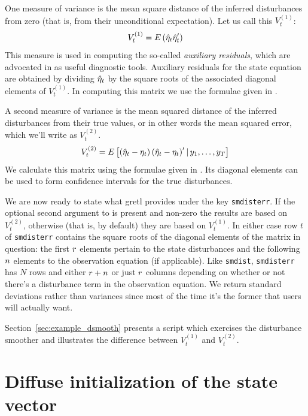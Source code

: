 One measure of variance is the mean square distance of the inferred
disturbances from zero (that is, from their unconditional
expectation). Let us call this $V^{(1)}_t$:
\[
V^{(1)}_t = E\left(\hat{\eta}_t\hat{\eta}_t'\right)
\]
This measure is used in computing the so-called \emph{auxiliary
  residuals}, which are advocated in \cite{durbin-koopman12} as useful
diagnostic tools. Auxiliary residuals for the state equation are
obtained by dividing $\hat{\eta}_t$ by the square roots of the
associated diagonal elements of $V^{(1)}_t$. In computing this matrix
we use the formulae given in \citet[section 4.4]{koopman-etal99}.

A second measure of variance is the mean squared distance of the
inferred disturbances from their true values, or in other words the
mean squared error, which we'll write as $V^{(2)}_t$.
\[
V^{(2)}_t = E\left[\left(\hat{\eta}_t - \eta_t\right)
  \left(\hat{\eta}_t - \eta_t\right)'
  | \,y_1, \ldots, y_T \right]
\]
We calculate this matrix using the formulae given in \citet[section
4.5.2]{durbin-koopman12}. Its diagonal elements can be used to form
confidence intervals for the true disturbances.

We are now ready to state what gretl provides under the key
\texttt{smdisterr}. If the optional second argument to 
is present and non-zero the results are based on $V^{(2)}_t$,
otherwise (that is, by default) they are based on $V^{(1)}_t$. In
either case row $t$ of \texttt{smdisterr} contains the square roots of
the diagonal elements of the matrix in question: the first $r$
elements pertain to the state disturbances and the following $n$
elements to the observation equation (if applicable). Like
\texttt{smdist}, \texttt{smdisterr} has $N$ rows and either
$r + n$ or just $r$ columns depending on whether or
not there's a disturbance term in the observation equation. We return
standard deviations rather than variances since most of the time it's
the former that users will actually want.

Section~\ref{sec:example_dsmooth} presents a script which exercises
the disturbance smoother and illustrates the difference between
$V^{(1)}_t$ and $V^{(2)}_t$.


\section{Diffuse initialization of the state vector}
\label{sec:diffuse}

